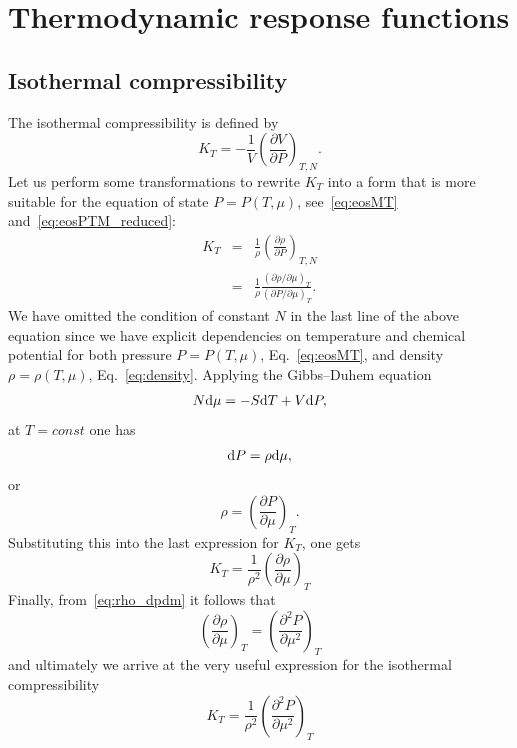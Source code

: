 \section{\label{sec:respons_functions}Thermodynamic response functions}

\subsection{Isothermal compressibility}
The isothermal compressibility is defined by
\begin{equation}
	\label{def:isotherm_compres}
	K_T = -\frac{1}{V}\left(\frac{\partial V}{\partial P}\right)_{T, N}.
\end{equation}
Let us perform some transformations to rewrite $K_T$ into a form that is more suitable for the equation of state $P=P(T,\mu)$, see~\eqref{eq:eosMT} and~\eqref{eq:eosPTM_reduced}:
\begin{eqnarray*}
	K_T	& = & \frac{1}{\rho} \left(\frac{\partial \rho}{\partial P} \right)_{T,N}
	\\
	& = & \frac{1}{\rho} \frac{\left(\partial \rho / \partial \mu\right)_{T}}
	{\left(\partial P / \partial \mu\right)_{T}}.
\end{eqnarray*}
We have omitted the condition of constant $N$ in the last line of the above equation since we have explicit dependencies on temperature and chemical potential for both pressure $P = P(T, \mu)$, Eq.~\eqref{eq:eosMT}, and density $\rho = \rho(T, \mu)$, Eq.~\eqref{eq:density}.
Applying the Gibbs--Duhem equation
\begin{equation}
	N{\rm d}\mu = -S{\rm d}T + V{\rm d}P,
\end{equation}
at $T = const$ one has 
\begin{equation*}
	{\rm d} P = \rho {\rm d} \mu,
\end{equation*}
or
\begin{equation}
	\label{eq:rho_dpdm}
	\rho = \left(\frac{\partial P}{\partial \mu}\right)_T.
\end{equation}
Substituting this into the last expression for $K_T$, one gets
\begin{equation}
	K_T = \frac{1}{\rho^2} \left(\frac{\partial \rho}{\partial \mu}\right)_{T}
\end{equation}
Finally, from~\eqref{eq:rho_dpdm} it follows that
\begin{equation}
	\left(\frac{\partial \rho}{\partial \mu}\right)_T = \left(\frac{\partial^2 P}{\partial \mu^2}\right)_T
\end{equation}
and ultimately we arrive at the very useful expression for the isothermal compressibility
\begin{equation}
	K_T = \frac{1}{\rho^2} \left(\frac{\partial^2 P}{\partial \mu^2}\right)_{T}
\end{equation}

